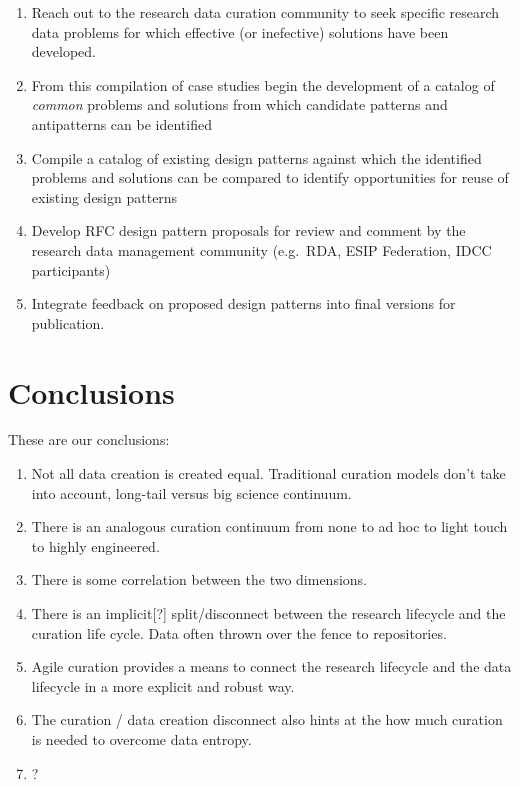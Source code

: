 \documentclass[paper]{ijdc-v9}
\begin{document}
\begin{enumerate}
\def\labelenumi{\arabic{enumi}.}
\itemsep1pt\parskip0pt
\item
  Reach out to the research data curation community to seek specific
  research data problems for which effective (or inefective) solutions
  have been developed.
\item
  From this compilation of case studies begin the development of a
  catalog of \emph{common} problems and solutions from which candidate
  patterns and antipatterns can be identified
\item
  Compile a catalog of existing design patterns against which the
  identified problems and solutions can be compared to identify
  opportunities for reuse of existing design patterns
\item
  Develop RFC design pattern proposals for review and comment by the
  research data management community (e.g.~RDA, ESIP Federation, IDCC
  participants)
\item
  Integrate feedback on proposed design patterns into final versions for
  publication.
\end{enumerate}

\section{Conclusions}\label{conclusions}

These are our conclusions:

\begin{enumerate}
\def\labelenumi{\arabic{enumi}.}
\itemsep1pt\parskip0pt
\item
  Not all data creation is created equal. Traditional curation models
  don't take into account, long-tail versus big science continuum.
\item
  There is an analogous curation continuum from none to ad hoc to light
  touch to highly engineered.
\item
  There is some correlation between the two dimensions. 
\item
  There is an implicit{[}?{]} split/disconnect between the research
  lifecycle and the curation life cycle. Data often thrown over the
  fence to repositories.
\item
  Agile curation provides a means to connect the research lifecycle and
  the data lifecycle in a more explicit and robust way.
\item
  The curation / data creation disconnect also hints at the how much
  curation is needed to overcome data entropy.
\item
  ?
\end{enumerate}
\end{document}
